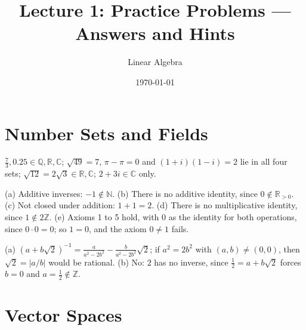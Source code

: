 \documentclass[11pt]{article}
\title{Lecture 1: Practice Problems --- Answers and Hints}
\author{Linear Algebra}
\date{\today}
\begin{document}
\maketitle

\section*{Number Sets and Fields}

\begin{description}[leftmargin=0pt, itemsep=0.3em]
    \item[\ref{pr:numbers}.] $\frac{7}{3}, 0.25 \in \mathbb{Q}, \mathbb{R}, \mathbb{C}$; $\sqrt{49} = 7$, $\pi - \pi = 0$ and $(1 + i)(1 - i) = 2$ lie in all four sets; $\sqrt{12} = 2\sqrt{3} \in \mathbb{R}, \mathbb{C}$; $2 + 3i \in \mathbb{C}$ only.
    \item[\ref{pr:field-fail}.] (a) Additive inverses: $-1 \notin \mathbb{N}$. (b) There is no additive identity, since $0 \notin \mathbb{R}_{>0}$. (c) Not closed under addition: $1 + 1 = 2$. (d) There is no multiplicative identity, since $1 \notin 2\mathbb{Z}$. (e) Axioms 1 to 5 hold, with $0$ as the identity for both operations, since $0 \cdot 0 = 0$; so $1 = 0$, and the axiom $0 \neq 1$ fails.
    \item[\ref{pr:Qsqrt2}.] (a) $(a + b\sqrt{2})^{-1} = \frac{a}{a^2 - 2b^2} - \frac{b}{a^2 - 2b^2}\sqrt{2}$; if $a^2 = 2b^2$ with $(a, b) \neq (0, 0)$, then $\sqrt{2} = |a/b|$ would be rational. (b) No: $2$ has no inverse, since $\frac{1}{2} = a + b\sqrt{2}$ forces $b = 0$ and $a = \frac{1}{2} \notin \mathbb{Z}$.
\end{description}

\section*{Vector Spaces}
\end{document}
